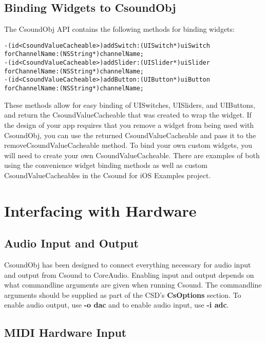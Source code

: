 \documentclass[11pt]{article}
\begin{document}
\subsection{Binding Widgets to CsoundObj}

The CsoundObj API contains the following methods for binding widgets:

\begin{lstlisting}[caption=Methods for Widget Binding]
-(id<CsoundValueCacheable>)addSwitch:(UISwitch*)uiSwitch forChannelName:(NSString*)channelName;
-(id<CsoundValueCacheable>)addSlider:(UISlider*)uiSlider forChannelName:(NSString*)channelName;
-(id<CsoundValueCacheable>)addButton:(UIButton*)uiButton forChannelName:(NSString*)channelName; 
\end{lstlisting}

These methods allow for easy binding of UISwitches, UISliders, and UIButtons, and return the CsoundValueCacheable that was created to wrap the widget. If the design of your app requires that you remove a widget from being used with CsoundObj, you can use the returned CsoundValueCacheable and pass it to the removeCsoundValueCacheable method. To bind your own custom widgets, you will need to create your own CsoundValueCacheable.  There are examples of both using the convenience widget binding methods as well as custom CsoundValueCacheables in the Csound for iOS Examples project.


\section{Interfacing with Hardware}
\subsection{Audio Input and Output}

CsoundObj has been designed to connect everything necessary for audio input and output from Csound to CoreAudio.  Enabling input and output depends on what commandline arguments are given when running Csound.  The commandline arguments should be supplied as part of the CSD's \textbf{CsOptions} section.  To enable audio output, use \textbf{-o dac} and to enable audio input, use \textbf{-i adc}. 

\subsection{MIDI Hardware Input}
\end{document}
